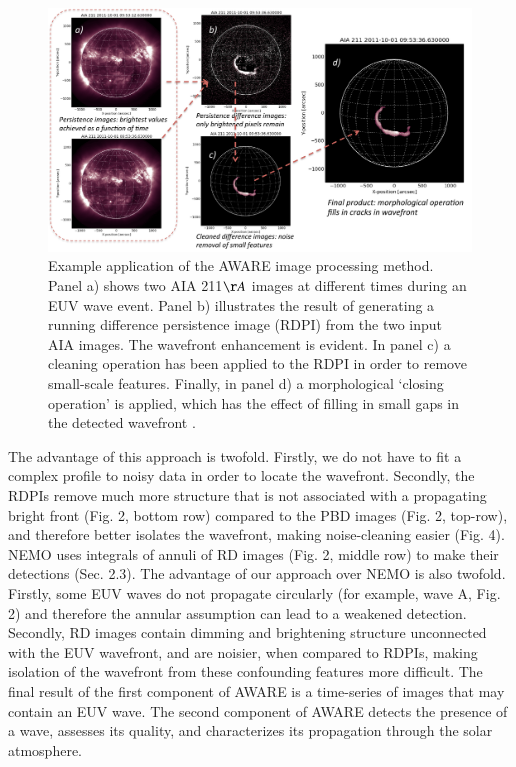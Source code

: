 \begin{figure}
\begin{center}
\includegraphics[width=16cm]{aware_figure4.pdf}
\caption{Example application of the AWARE image processing
  method. Panel a) shows two AIA 211$\AA$ images at different times
  during an EUV wave event. Panel b) illustrates the result of
  generating a running difference persistence image (RDPI) from the
  two input AIA images. The wavefront enhancement is evident. In panel
  c) a cleaning operation has been applied to the RDPI in order to
  remove small-scale features. Finally, in panel d) a morphological
  `closing operation' is applied, which has the effect of filling in
  small gaps in the detected wavefront
  \citep[e.g.][]{2002dip..book.....G}.}
\label{method_figure}
\end{center}
\end{figure}


The advantage of this approach is twofold. Firstly, we do not have to
fit a complex profile to noisy data in order to locate the
wavefront. Secondly, the RDPIs remove much more structure that is not
associated with a propagating bright front (Fig. 2, bottom row)
compared to the PBD images (Fig. 2, top-row), and therefore better
isolates the wavefront, making noise-cleaning easier (Fig. 4).  NEMO
\citep{2005SoPh..228..265P} uses integrals of annuli of RD images
(Fig. 2, middle row) to make their detections (Sec. 2.3).  The
advantage of our approach over NEMO is also twofold.  Firstly, some
EUV waves do not propagate circularly (for example, wave A, Fig. 2)
and therefore the annular assumption can lead to a weakened detection.
Secondly, RD images contain dimming and brightening structure
unconnected with the EUV wavefront, and are noisier, when compared to
RDPIs, making isolation of the wavefront from these confounding
features more difficult. The final result of the first component of
AWARE is a time-series of images that may contain an EUV wave.  The
second component of AWARE detects the presence of a wave, assesses its
quality, and characterizes its propagation through the solar
atmosphere.
